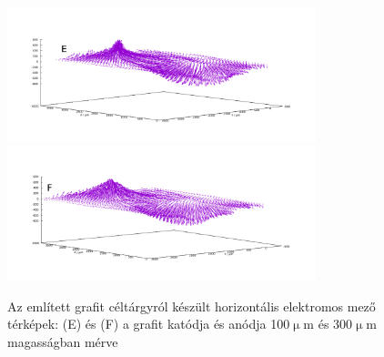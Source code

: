 \begin{figure}
\centering
\includegraphics[width=0.8\textwidth]{img/mérések/grafit_100.pdf}
\includegraphics[width=0.8\textwidth]{img/mérések/grafit_300.pdf}

\caption{Az említett grafit céltárgyról készült horizontális elektromos mező térképek:
(E) és (F) a grafit katódja és anódja 100$\upmu$m és 300$\upmu$m magasságban mérve}
\label{fig:field_gh}
\end{figure}

